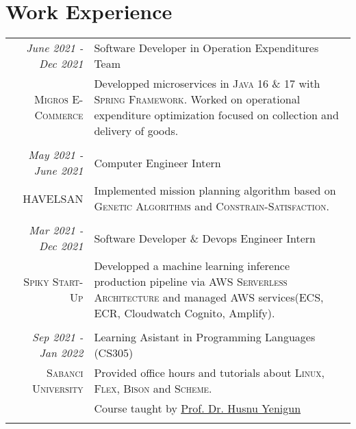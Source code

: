 \documentclass[a4paper,10pt]{article} %
\begin{document}



\section{Work Experience}

\begin{longtable}{r|p{11cm}}

\emph{June 2021 - Dec 2021} & Software Developer in Operation Expenditures Team\\
\textsc{Migros E-Commerce} & \footnotesize{Developped microservices in \textsc{Java 16 \& 17} with \textsc{Spring Framework}. Worked on operational expenditure optimization focused on collection and delivery of goods.}\\
\multicolumn{2}{c}{} \\

\emph{May 2021 - June 2021} & Computer Engineer Intern\\
\textsc{HAVELSAN} & \footnotesize{Implemented mission planning algorithm based on \textsc{Genetic Algorithms} and \textsc{Constrain-Satisfaction}.}\\
\multicolumn{2}{c}{} \\

\emph{Mar 2021 - Dec 2021} & Software Developer \& Devops Engineer Intern \\
\textsc{Spiky Start-Up} & \footnotesize{Developped a machine learning inference production pipeline via \textsc{AWS Serverless Architecture} and managed AWS services(ECS, ECR, Cloudwatch Cognito, Amplify).}\\
\multicolumn{2}{c}{} \\

\emph{Sep 2021 - Jan 2022} & Learning Asistant in Programming Languages (CS305)\\
\textsc{Sabanci University} & \footnotesize{Provided office hours and tutorials about \textsc{Linux}, \textsc{Flex}, \textsc{Bison} and \textsc{Scheme}.}\\
& \footnotesize{Course taught by \href{mailto:husnuyenigun@sabanciuniv.edu}{Prof. Dr. Husnu Yenigun}}\\
\multicolumn{2}{c}{} \\

\end{longtable}
\end{document}
